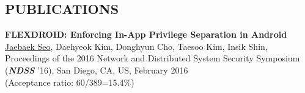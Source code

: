 \documentclass{res}
\begin{document}
\begin{resume}
\section{PUBLICATIONS}
   \vspace{0.1in}
    \textbf{FLEXDROID: Enforcing In-App Privilege Separation in Android}\\
    \underline{Jaebaek Seo}, Daehyeok Kim, Donghyun Cho, Taesoo Kim, Insik Shin,\\
    Proceedings of the 2016 Network and Distributed System Security Symposium (\emph{\textbf{NDSS}} '16),
    San Diego, CA, US, February 2016\\
    {\small(Acceptance ratio: 60/389=15.4\%)}


\end{resume}
\end{document}
